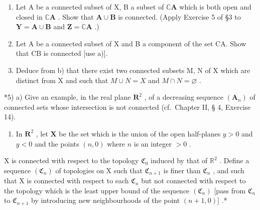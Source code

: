 \begin{enumerate}
\def\labelenumi{\alph{enumi})}
\item
  Let A be a connected subset of X, B a subset of \(\mathbb{C}\mathbf{A}\) which is both open and closed in \(\mathbb{C}\mathbf{A}\) . Show that \(\mathbf{A} \cup \mathbf{B}\) is connected. (Apply Exercise 5 of §3 to \(\mathbf{Y} = \mathbf{A} \cup \mathbf{B}\) and \(\mathbf{Z} = \mathbb{C}\mathbf{A}\) .)
\item
  Let A be a connected subset of X and B a component of the set CA. Show that CB is connected {[}use a){]}.
\item
  Deduce from b) that there exist two connected subsets M, N of X which are distinct from X and such that \(M \cup N = X\) and \(M \cap N = \varnothing\) .
\end{enumerate}

*5) a) Give an example, in the real plane \(\mathbf{R}^2\) , of a decreasing sequence \((\mathbf{A}_n)\) of connected sets whose intersection is not connected (cf.~Chapter II, § 4, Exercise 14).

\begin{enumerate}
\def\labelenumi{\alph{enumi})}
\setcounter{enumi}{1}
\tightlist
\item
  In \(\mathbf{R}^2\) , let \(\mathbf{X}\) be the set which is the union of the open half-planes \(y > 0\) and \(y < 0\) and the points \((n, 0)\) where \(n\) is an integer \(> 0\) .
\end{enumerate}

X is connected with respect to the topology \(\mathfrak{C}_0\) induced by that of \(\mathbb{R}^2\) . Define a sequence \((\mathfrak{C}_n)\) of topologies on X such that \(\mathfrak{C}_{n+1}\) is finer than \(\mathfrak{C}_n\) , and such that X is connected with respect to each \(\mathfrak{C}_n\) but not connected with respect to the topology which is the least upper bound of the sequence \((\mathfrak{C}_n)\) {[}pass from \(\mathfrak{C}_n\) to \(\mathfrak{C}_{n+1}\) by introducing new neighbourhoods of the point \((n+1,0)]\) .*

